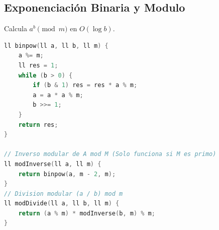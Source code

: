 \documentclass[11pt]{article}
\begin{document}
\subsection{Exponenciación Binaria y Modulo}
Calcula $a^b \pmod m$ en $O(\log b)$.
\begin{lstlisting}[language=C++]
ll binpow(ll a, ll b, ll m) {
    a %= m;
    ll res = 1;
    while (b > 0) {
        if (b & 1) res = res * a % m;
        a = a * a % m;
        b >>= 1;
    }
    return res;
}

// Inverso modular de A mod M (Solo funciona si M es primo)
ll modInverse(ll a, ll m) {
    return binpow(a, m - 2, m);
}
// Division modular (a / b) mod m
ll modDivide(ll a, ll b, ll m) {
    return (a % m) * modInverse(b, m) % m;
}
\end{lstlisting}
\end{document}

